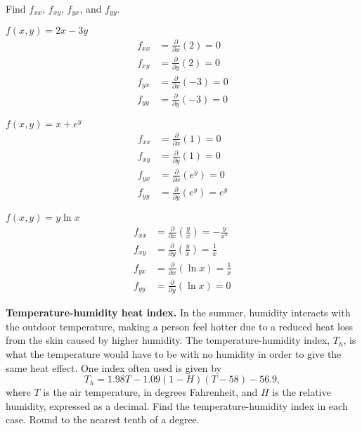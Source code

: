 \documentclass[12pt]{article}
\newenvironment{problem}[2][]{
    \begin{trivlist}
        \item[
            {\bfseries #1}
            {\bfseries #2.}
        ]
}{\end{trivlist}}
\begin{document}
\noindent Find $f_{xx}$, $f_{xy}$, $f_{yx}$, and $f_{yy}$.

\begin{problem}{33}
    $f(x,y) = 2x - 3y$
    \begin{align}
        f_{xx} &= \frac{\partial}{\partial x} \left(2\right) = 0 \\
        f_{xy} &= \frac{\partial}{\partial y} \left(2\right) = 0 \\
        f_{yx} &= \frac{\partial}{\partial x} \left(-3\right) = 0 \\
        f_{yy} &= \frac{\partial}{\partial y} \left(-3\right) = 0
    \end{align}
\end{problem}

\begin{problem}{37}
    $f(x,y) = x + e^y$
    \begin{align}
        f_{xx} &= \frac{\partial}{\partial x} \left(1\right) = 0 \\
        f_{xy} &= \frac{\partial}{\partial y} \left(1\right) = 0 \\
        f_{yx} &= \frac{\partial}{\partial x} \left(e^y\right) = 0 \\
        f_{yy} &= \frac{\partial}{\partial y} \left(e^y\right) = e^y
    \end{align}
\end{problem}

\begin{problem}{39}
    $f(x,y) = y \ln x$
    \begin{align}
        f_{xx} &= \frac{\partial}{\partial x} \left(\frac{y}{x}\right) = - \frac{y}{x^2} \\
        f_{xy} &= \frac{\partial}{\partial y} \left(\frac{y}{x}\right) = \frac{1}{x} \\
        f_{yx} &= \frac{\partial}{\partial x} \left(\ln{x}\right) = \frac{1}{x} \\
        f_{yy} &= \frac{\partial}{\partial y} \left(\ln{x}\right) = 0
    \end{align}
\end{problem}

\bigskip

\noindent \textbf{Temperature-humidity heat index.}
In the summer, humidity interacts with the outdoor temperature, making a person feel hotter due to a reduced heat loss from the skin caused by higher humidity.
The temperature-humidity index, $T_h$, is what the temperature would have to be with no humidity in order to give the same heat effect.
One index often used is given by $$T_h = 1.98T - 1.09(1 - H)(T - 58) - 56.9,$$ where $T$ is the air temperature, in degrees Fahrenheit, and $H$ is the relative humidity, expressed as a decimal.
Find the temperature-humidity index in each case.
Round to the nearest tenth of a degree.
\end{document}

